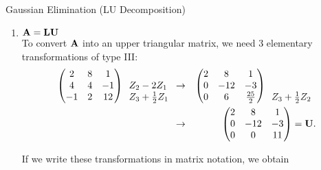 \documentclass[11pt,compress,t,notes=noshow, xcolor=table]{beamer}
\begin{document}
\begin{vbframe}{Gaussian Elimination (LU Decomposition)}
\begin{enumerate}
\item $\mathbf{A} = \mathbf{LU}$\\

To convert $\mathbf{A}$ into an upper triangular matrix, we need 3
elementary transformations of type III:
\footnotesize
\begin{eqnarray*}
\begin{pmatrix} 
2 & 8 & 1 \\
4 & 4 & -1 \\
-1 & 2 & 12  \end{pmatrix}
\begin{array}{l}
 \\
Z_2 - 2Z_1 \\
Z_3 + \frac{1}{2} Z_1
\end{array} &\rightarrow& \begin{pmatrix} 
2 & 8 & 1 \\
0 & -12 & -3 \\
0 & 6 & \frac{25}{2}  \end{pmatrix}
\begin{array}{l}
 \\
 \\
 Z_3 + \frac{1}{2} Z_2
\end{array} \\
&\rightarrow& \begin{pmatrix} 
2 & 8 & 1 \\
0 & -12 & -3 \\
0 & 0 & 11  \end{pmatrix}
= \mathbf{U}.
\end{eqnarray*} \normalsize

\framebreak

If we write these transformations in matrix notation, we obtain


\end{enumerate}
\end{vbframe}
\end{document}
